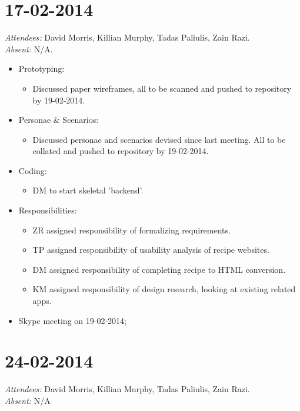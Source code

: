\documentclass{article}
\begin{document}
\clearpage

\section*{17-02-2014}
\vspace{0.5cm}
\emph{Attendees: }David Morris, Killian Murphy, Tadas Paliulis, Zain Razi.
\\
\emph{Absent: }N/A.

\begin{itemize}
\item Prototyping:
  \begin{itemize}
  \item Discussed paper wireframes, all to be scanned and pushed to repository by 19-02-2014.
  \end{itemize}
\item Personae \& Scenarios:
  \begin{itemize}
  \item Discussed personae and scenarios devised since last meeting. All to be collated and pushed to repository by 19-02-2014.
  \end{itemize}
\item Coding:
  \begin{itemize}
  \item DM to start skeletal 'backend'.
  \end{itemize}
\item Responsibilities:
  \begin{itemize}
  \item ZR assigned responsibility of formalizing requirements.
  \item TP assigned responsibility of usability analysis of recipe websites.
  \item DM assigned responsibility of completing recipe to HTML conversion.
  \item KM assigned responsibility of design research, looking at existing related apps.
  \end{itemize}
\item Skype meeting on 19-02-2014;
\end{itemize}

\clearpage

\section*{24-02-2014}
\vspace{0.5cm}
\emph{Attendees: }David Morris, Killian Murphy, Tadas Paliulis, Zain Razi.
\\
\emph{Absent: }N/A
\end{document}
